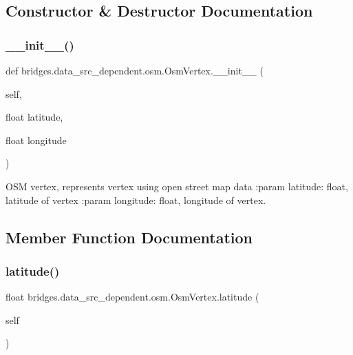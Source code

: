 \subsection{Constructor \& Destructor Documentation}
\mbox{\label{classbridges_1_1data__src__dependent_1_1osm_1_1_osm_vertex_a638bc812da9e82085a8692f57468b95e}} 
\subsubsection{\texorpdfstring{\_\_init\_\_()}{\_\_init\_\_()}}
{\footnotesize\ttfamily def bridges.\+data\+\_\+src\+\_\+dependent.\+osm.\+Osm\+Vertex.\+\_\+\+\_\+init\+\_\+\+\_\+ (\begin{DoxyParamCaption}\item[{}]{self,  }\item[{float}]{latitude,  }\item[{float}]{longitude }\end{DoxyParamCaption})}



O\+SM vertex, represents vertex using open street map data \+:param latitude\+: float, latitude of vertex \+:param longitude\+: float, longitude of vertex. 



\subsection{Member Function Documentation}
\mbox{\label{classbridges_1_1data__src__dependent_1_1osm_1_1_osm_vertex_af84ed314a3dfab4367d1a3cf9f4ae8e4}} 
\subsubsection{\texorpdfstring{latitude()}{latitude()}\hspace{0.1cm}{\footnotesize\ttfamily [1/3]}}
{\footnotesize\ttfamily  float bridges.\+data\+\_\+src\+\_\+dependent.\+osm.\+Osm\+Vertex.\+latitude (\begin{DoxyParamCaption}\item[{}]{self }\end{DoxyParamCaption})}



